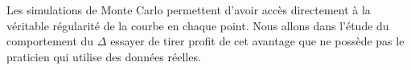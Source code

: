 Les simulations de Monte Carlo permettent d'avoir accès directement à la véritable régularité de la courbe en chaque point. Nous allons dans l'étude du comportement du $\Delta$ essayer de tirer profit de cet avantage que ne possède pas le praticien qui utilise des données réelles.



\begin{comment}
\subsection{Récapitulatif concernant le risque quadratique sur l'estimation de la régularité}


\end{comment}
